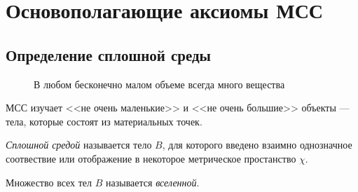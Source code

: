 \section{Основополагающие аксиомы МСС}

\subsection{Определение сплошной среды}

\begin{figure}[H]
	\centering
	\begin{minipage}{0.3\linewidth}
		\centering
		
	\end{minipage} 
	\hspace{25mm}
	\begin{minipage}{0.3\linewidth}
		\centering
		
		\caption{В любом бесконечно малом объеме всегда много вещества}
	\end{minipage}	
\end{figure}

%	

МСС изучает <<не очень маленькие>> и <<не очень большие>> объекты --- тела, которые состоят
из материальных точек.

%  

\begin{figure}[H]
	\centering
	
\end{figure}

\begin{definition}
  \emph{Сплошной средой} называется тело $B$, для которого введено взаимно однозначное соотвествие
  или отображение в некоторое метрическое простанство $\chi$.
\end{definition}

\begin{definition}
  Множество всех тел $B$ называется \emph{вселенной}.
\end{definition}

%	

